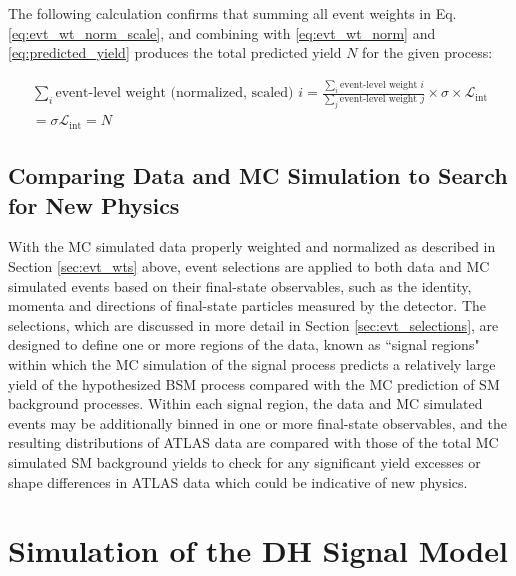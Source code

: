 \noindent The following calculation confirms that summing all event weights in Eq. \ref{eq:evt_wt_norm_scale}, and combining with \ref{eq:evt_wt_norm} and \ref{eq:predicted_yield} produces the total predicted yield \(N\) for the given process:

\begin{multline}
\label{eq:evt_wt_sum}
\sum_i\text{event-level weight (normalized, scaled) }i = \frac{\sum_i \text{event-level weight }i}{\sum_j \text{event-level weight }j}\times \sigma \times \mathcal{L}_\text{int} \\
 = \sigma\mathcal{L}_\text{int} = N
\end{multline}

\subsection{Comparing Data and MC Simulation to Search for New Physics}

With the MC simulated data properly weighted and normalized as described in Section \ref{sec:evt_wts} above, event selections are applied to both data and MC simulated events based on their final-state observables, such as the identity, momenta and directions of final-state particles measured by the detector. The selections, which are discussed in more detail in Section \ref{sec:evt_selections}, are designed to define one or more regions of the data, known as ``signal regions" within which the MC simulation of the signal process predicts a relatively large yield of the hypothesized BSM process compared with the MC prediction of SM background processes. Within each signal region, the data and MC simulated events may be additionally binned in one or more final-state observables, and the resulting distributions of ATLAS data are compared with those of the total MC simulated SM background yields to check for any significant yield excesses or shape differences in ATLAS data which could be indicative of new physics.

\section{Simulation of the DH Signal Model}
\label{sec:DH_model_sim}

